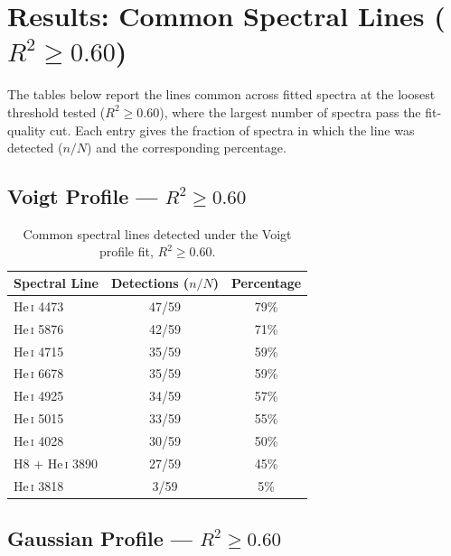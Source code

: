 \documentclass[12pt]{article}
\begin{document}
\section{Results: Common Spectral Lines ($R^2 \geq 0.60$)}
\label{sec:results}

The tables below report the lines common across fitted spectra at the loosest threshold tested ($R^2 \geq 0.60$), where the largest number of spectra pass the fit-quality cut. Each entry gives the fraction of spectra in which the line was detected ($n/N$) and the corresponding percentage.

\subsection{Voigt Profile --- \texorpdfstring{$R^2 \geq 0.60$}{R2 >= 0.60}}
\label{subsec:voigt-lines}

\begin{table}[htbp]
\centering
\caption{Common spectral lines detected under the Voigt profile fit, $R^2 \geq 0.60$.}
\label{tab:voigt-lines}
\begin{tabular}{@{}lcc@{}}
\toprule
\textbf{Spectral Line} & \textbf{Detections ($n/N$)} & \textbf{Percentage} \\
\midrule
He\,\textsc{i} 4473        & 47/59 & 79\% \\
He\,\textsc{i} 5876        & 42/59 & 71\% \\
He\,\textsc{i} 4715        & 35/59 & 59\% \\
He\,\textsc{i} 6678        & 35/59 & 59\% \\
He\,\textsc{i} 4925        & 34/59 & 57\% \\
He\,\textsc{i} 5015        & 33/59 & 55\% \\
He\,\textsc{i} 4028        & 30/59 & 50\% \\
H8 + He\,\textsc{i} 3890   & 27/59 & 45\% \\
He\,\textsc{i} 3818        & 3/59  & 5\%  \\
\bottomrule
\end{tabular}
\end{table}

\subsection{Gaussian Profile --- \texorpdfstring{$R^2 \geq 0.60$}{R2 >= 0.60}}
\label{subsec:gaussian-lines}
\end{document}
